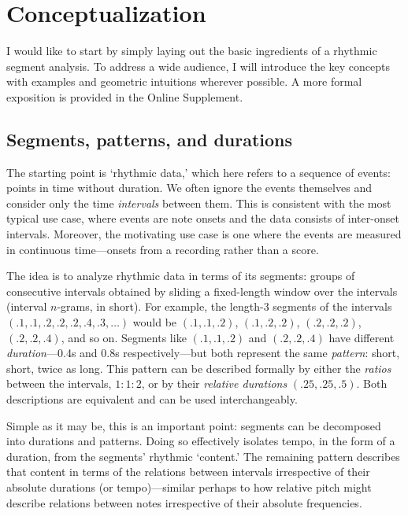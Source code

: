 \documentclass{tMAM2e}%
\theoremstyle{plain}
\theoremstyle{definition}
\theoremstyle{remark}
\begin{document}
\section{Conceptualization}%
\label{sec:conceptualization}


I would like to start by simply laying out the basic ingredients of a rhythmic segment analysis. 
To address a wide audience, I will introduce the key concepts with examples and geometric intuitions wherever possible. 
A more formal exposition is provided in the Online Supplement.

\subsection{Segments, patterns, and durations}
The starting point is ‘rhythmic data,’ which here refers to a sequence of events: points in time without duration. 
We often ignore the events themselves and consider only the time \emph{intervals} between them. 
This is consistent with the most typical use case, where events are note onsets and the data consists of inter-onset intervals. 
Moreover, the motivating use case is one where the events are measured in continuous time—onsets from a recording rather than a score.

The idea is to analyze rhythmic data in terms of its segments: groups of consecutive intervals obtained by sliding a fixed-length window over the intervals (interval $n$-grams, in short). 
For example, the length-3 segments of the intervals $(.1, .1, .2, .2, .2, .4, .3, \dots)$ would be $(.1, .1, .2)$, $(.1, .2, .2)$, $(.2, .2, .2)$, $(.2, .2, .4)$, and so on. 
Segments like $(.1, .1, .2)$ and $(.2, .2, .4)$ have different \emph{duration}—0.4s and 0.8s respectively—but both represent the same \emph{pattern}: short, short, twice as long. 
This pattern can be described formally by either the \emph{ratios} between the intervals, $1 : 1 : 2$, or by their \emph{relative durations} $(.25, .25, .5)$. 
Both descriptions are equivalent and can be used interchangeably. 

Simple as it may be, this is an important point: segments can be decomposed into durations and patterns. 
Doing so effectively isolates tempo, in the form of a duration, from the segments’ rhythmic ‘content.’ 
The remaining pattern describes that content in terms of the relations between intervals irrespective of their absolute durations (or tempo)—similar perhaps to how relative pitch might describe relations between notes irrespective of their absolute frequencies. 
\end{document}

